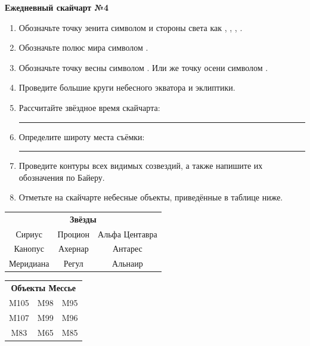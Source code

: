 \documentclass{./SAS-class-skygen}
\begin{document}
    
    
    
	\begin{center}
		\large\textbf{Ежедневный скайчарт №4}
	\end{center}

	\begin{enumerate}
		\item Обозначьте точку зенита символом  и стороны света как , , , .
		\item Обозначьте полюс мира символом .
		\item Обозначьте точку весны символом \Aries. Или же точку осени символом \Libra.
		\item Проведите большие круги небесного экватора и эклиптики.
		\item Рассчитайте звёздное время скайчарта: \rule{2cm}{0.4pt}
		\item Определите широту места съёмки: \rule{2cm}{0.4pt}
		\item Проведите контуры всех видимых созвездий, а также напишите их обозначения по Байеру.
		\item Отметьте на скайчарте небесные объекты, приведённые в таблице ниже.
	\end{enumerate}
	
    \vspace{0.5cm}

    \begin{table}[h!]
    \centering
    \begin{tabular}{ccc}
    \multicolumn{3}{c}{\textbf{Звёзды}} \\ Сириус & Процион & Альфа Центавра \\
Канопус & Ахернар & Антарес \\
Меридиана & Регул & Альнаир \\

\end{tabular}
    \hfill
    \begin{tabular}{ccc}
    \multicolumn{3}{c}{\textbf{Объекты Мессье}} \\ M105 & M98 & M95 \\
M107 & M99 & M96 \\
M83 & M65 & M85 \\

\end{tabular}
    \end{table}
	
\end{document}

